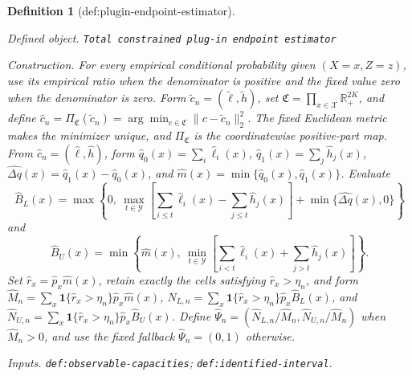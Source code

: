 \documentclass{article}
\newtheorem{definition}{Definition}
\begin{document}
\begin{definition}[def:plugin-endpoint-estimator]\label{def:plugin-endpoint-estimator}
\par\smallskip\noindent\emph{Defined object.} \texttt{Total constrained plug-\allowbreak{}in endpoint estimator}
\par\smallskip\noindent\emph{Construction.} For every empirical conditional probability given \((X=x,Z=z)\), use its empirical ratio when the denominator is positive and the fixed value zero when the denominator is zero. Form \(\widetilde c_n=(\widetilde\ell,\widetilde h)\), set \(\mathfrak C=\prod_{x\in\mathcal X}\mathbb R_+^{2K}\), and define \(\widehat c_n=\Pi_{\mathfrak C}(\widetilde c_n)=\arg\min_{c\in\mathfrak C}\|c-\widetilde c_n\|_2^2\). The fixed Euclidean metric makes the minimizer unique, and \(\Pi_{\mathfrak C}\) is the coordinatewise positive-part map. From \(\widehat c_n=(\widehat\ell,\widehat h)\), form \(\widehat q_0(x)=\sum_i\widehat\ell_i(x)\), \(\widehat q_1(x)=\sum_j\widehat h_j(x)\), \(\widehat{\Delta q}(x)=\widehat q_1(x)-\widehat q_0(x)\), and \(\widehat m(x)=\min\{\widehat q_0(x),\widehat q_1(x)\}\). Evaluate
\[
\widehat B_L(x)=\max\left\{0,\ \max_{t\in\mathcal Y}\left[\sum_{i\le t}\widehat\ell_i(x)-\sum_{j\le t}\widehat h_j(x)\right]+\min\{\widehat{\Delta q}(x),0\}\right\}
\]
and
\[
\widehat B_U(x)=\min\left\{\widehat m(x),\ \min_{t\in\mathcal Y}\left[\sum_{i<t}\widehat\ell_i(x)+\sum_{j>t}\widehat h_j(x)\right]\right\}.
\]
Set \(\widehat r_x=\widehat p_x\widehat m(x)\), retain exactly the cells satisfying \(\widehat r_x>\eta_n\), and form \(\widehat M_n=\sum_x\mathbf 1\{\widehat r_x>\eta_n\}\widehat p_x\widehat m(x)\), \(\widehat N_{L,n}=\sum_x\mathbf 1\{\widehat r_x>\eta_n\}\widehat p_x\widehat B_L(x)\), and \(\widehat N_{U,n}=\sum_x\mathbf 1\{\widehat r_x>\eta_n\}\widehat p_x\widehat B_U(x)\). Define \(\widehat\Psi_n=(\widehat N_{L,n}/\widehat M_n,\widehat N_{U,n}/\widehat M_n)\) when \(\widehat M_n>0\), and use the fixed fallback \(\widehat\Psi_n=(0,1)\) otherwise.
\par\smallskip\noindent\emph{Inputs.} \texttt{def:\allowbreak{}observable-\allowbreak{}capacities}; \texttt{def:\allowbreak{}identified-\allowbreak{}interval}.
\end{definition}
\end{document}

